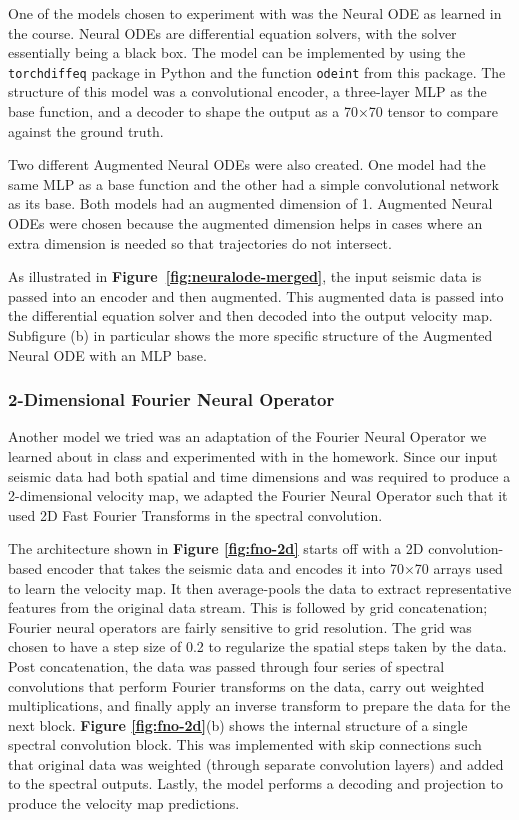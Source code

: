 \documentclass{article}
\begin{document}
One of the models chosen to experiment with was the Neural ODE as learned in the course. Neural ODEs are differential equation solvers, with the solver essentially being a black box. The model can be implemented by using the \texttt{torchdiffeq} package in Python and the function \texttt{odeint} from this package. The structure of this model was a convolutional encoder, a three-layer MLP as the base function, and a decoder to shape the output as a 70×70 tensor to compare against the ground truth. 

Two different Augmented Neural ODEs were also created. One model had the same MLP as a base function and the other had a simple convolutional network as its base. Both models had an augmented dimension of 1. Augmented Neural ODEs were chosen because the augmented dimension helps in cases where an extra dimension is needed so that trajectories do not intersect.

As illustrated in \textbf{Figure~\ref{fig:neuralode-merged}}, the input seismic data is passed into an encoder and then augmented. This augmented data is passed into the differential equation solver and then decoded into the output velocity map. Subfigure (b) in particular shows the more specific structure of the Augmented Neural ODE with an MLP base.


\subsubsection{2-Dimensional Fourier Neural Operator}

Another model we tried was an adaptation of the Fourier Neural Operator \cite{fno} we learned about in class and experimented with in the homework. Since our input seismic data had both spatial and time dimensions and was required to produce a 2-dimensional velocity map, we adapted the Fourier Neural Operator such that it used 2D Fast Fourier Transforms in the spectral convolution.

The architecture shown in \textbf{Figure \ref{fig:fno-2d}} starts off with a 2D convolution-based encoder that takes the seismic data and encodes it into 70×70 arrays used to learn the velocity map. It then average-pools the data to extract representative features from the original data stream. This is followed by grid concatenation; Fourier neural operators are fairly sensitive to grid resolution. The grid was chosen to have a step size of 0.2 to regularize the spatial steps taken by the data. Post concatenation, the data was passed through four series of spectral convolutions that perform Fourier transforms on the data, carry out weighted multiplications, and finally apply an inverse transform to prepare the data for the next block. \textbf{Figure \ref{fig:fno-2d}}(b) shows the internal structure of a single spectral convolution block. This was implemented with skip connections such that original data was weighted (through separate convolution layers) and added to the spectral outputs. Lastly, the model performs a decoding and projection to produce the velocity map predictions.
\end{document}
